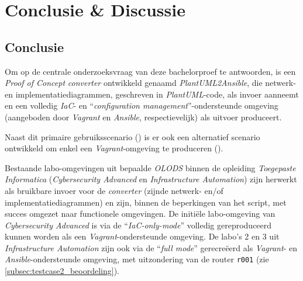 
\chapter{Conclusie \& Discussie}%
\label{ch:conclusie_discussie}



\section{Conclusie}%
\label{sec:conclusie}

Om op de centrale onderzoeksvraag van deze bachelorproef te antwoorden, is een \emph{Proof of Concept} \emph{converter} ontwikkeld genaamd \emph{PlantUML2Ansible}, die netwerk- en implementatiediagrammen, geschreven in \emph{PlantUML}-code, als invoer aanneemt en een volledig \emph{IaC}- en ``\emph{configuration management}''-ondersteunde omgeving (aangeboden door \emph{Vagrant} en \emph{Ansible}, respectievelijk) als uitvoer produceert.

Naast dit primaire gebruiksscenario () is er ook een alternatief scenario ontwikkeld om enkel een \emph{Vagrant}-omgeving te produceren ().

Bestaande labo-omgevingen uit bepaalde \emph{OLODS} binnen de opleiding \emph{Toegepaste Informatica} (\emph{Cybersecurity Advanced} en \emph{Infrastructure Automation}) zijn herwerkt als bruikbare invoer voor de \emph{converter} (zijnde netwerk- en/of implementatiediagrammen) en zijn, binnen de beperkingen van het script, met succes omgezet naar functionele omgevingen.
De initiële labo-omgeving van \emph{Cybersecurity Advanced} is via de ``\emph{IaC-only-mode}'' volledig gereproduceerd kunnen worden als een \emph{Vagrant}-ondersteunde omgeving.
De labo's 2 en 3 uit \emph{Infrastructure Automation} zijn ook via de ``\emph{full mode}'' gerecreëerd als \emph{Vagrant}- en \emph{Ansible}-ondersteunde omgeving, met uitzondering van de router \texttt{r001} (zie \autoref{subsec:testcase2_beoordeling}).


